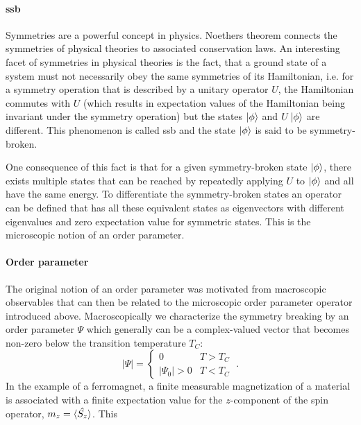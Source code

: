 \documentclass[../notes.tex]{subfiles}
\begin{document}
\paragraph{\acrlong{ssb}}

Symmetries are a powerful concept in physics.
Noethers theorem \cite{noetherInvarianteVariationsprobleme1918} connects the symmetries of physical theories to associated conservation laws.
An interesting facet of symmetries in physical theories is the fact, that a ground state of a system must not necessarily obey the same symmetries of its Hamiltonian, i.e. for a symmetry operation that is described by a unitary operator \(U\), the Hamiltonian commutes with \(U\) (which results in expectation values of the Hamiltonian being invariant under the symmetry operation) but the states \(\ket{\phi}\) and \(U \ket{\phi}\) are different.
This phenomenon is called \acrfull{ssb} and the state \(\ket{\phi}\) is said to be symmetry-broken.

One consequence of this fact is that for a given symmetry-broken state \(\ket{\phi}\), there exists multiple states that can be reached by repeatedly applying \(U\) to \(\ket{\phi}\) and all have the same energy.
To differentiate the symmetry-broken states an operator can be defined that has all these equivalent states as eigenvectors with different eigenvalues and zero expectation value for symmetric states.
This is the microscopic notion of an order parameter.

\paragraph{Order parameter}

The original notion of an order parameter was motivated from macroscopic observables that can then be related to the microscopic order parameter operator introduced above.
Macroscopically we characterize the symmetry breaking by an order parameter \(\Psi\) which generally can be a complex-valued vector that becomes non-zero below the transition temperature \(T_C\):
\begin{equation}
	\vert \Psi \vert =
	\begin{cases}
		0 & T > T_C \\
		\vert \Psi_0 \vert > 0 & T < T_C
	\end{cases} \;.
\end{equation}
In the example of a ferromagnet, a finite measurable magnetization of a material is associated with a finite expectation value for the \(z\)-component of the spin operator, \(m_z = \braket{\hat{S_z}}\).
This \cite{landauTheoryPhaseTransitions1937}
\end{document}
